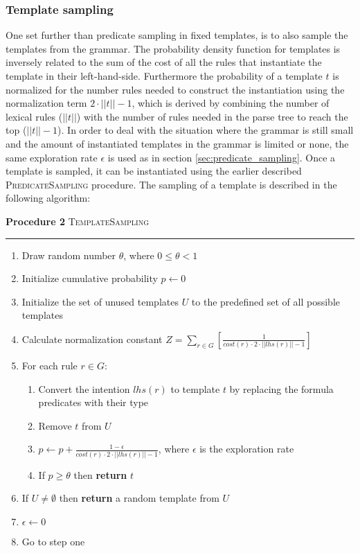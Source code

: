 \documentclass[a4paper]{article}
\begin{document}
\subsubsection{Template sampling}
\label{ssec:Template sampling}
One set further than predicate sampling in fixed templates, is to also sample the templates from the grammar. The probability density function for templates is inversely related to the sum of the cost of all the rules that instantiate the template in their left-hand-side. Furthermore the probability of a template $t$ is normalized for the number rules needed to construct the instantiation using the normalization term $2 \cdot \left|\left|t\right|\right| - 1$, which is derived by combining the number of lexical rules ($\left|\left|t\right|\right|$) with the number of rules needed in the parse tree to reach the top ($\left|\left|t\right|\right|-1$). In order to deal with the situation where the grammar is still small and the amount of instantiated templates in the grammar is limited or none, the same exploration rate $\epsilon$ is used as in section \ref{sec:predicate_sampling}. Once a template is sampled, it can be instantiated using the earlier described \textsc{PredicateSampling} procedure. The sampling of a template is described in the following algorithm:
\begin{mdframed}
    \textbf{Procedure 2} \textsc{TemplateSampling}\vspace{0.2cm}\hrule\vspace{0.2cm}
\begin{enumerate}
    \item Draw random number $\theta$, where $0 \leq \theta < 1$
    \item Initialize cumulative probability $p \gets 0$
    \item Initialize the set of unused templates $U$ to the predefined set of all possible templates
    \item Calculate normalization constant $Z = \sum_{r \in G} \left[ \frac{1}{cost(r) \cdot 2 \cdot \left|\left|lhs(r)\right|\right| - 1} \right]$
    \item For each rule $r \in G$:
        \begin{enumerate}
            \item Convert the intention $lhs(r)$ to template $t$ by replacing the formula predicates with their type
            \item Remove $t$ from $U$
            \item $p \gets p + \frac{1 - \epsilon}{cost(r) \cdot 2 \cdot \left|\left|lhs(r)\right|\right| - 1}$, where $\epsilon$ is the exploration rate
            \item If $p \geq \theta$ then \textbf{return} $t$
        \end{enumerate}
    \item If $U \neq \emptyset$ then \textbf{return} a random template from $U$
    \item $\epsilon \gets 0$
    \item Go to step one
\end{enumerate}
\end{mdframed}
\end{document}
